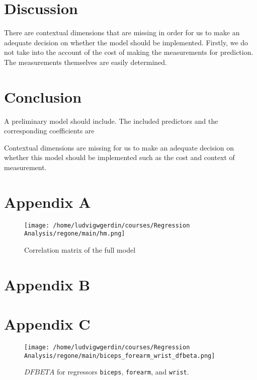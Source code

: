 \documentclass[11pt]{article}
\begin{document}


\newpage
\section{Discussion}
\label{sec:orge3adaf6}

There are contextual dimensions that are missing in order for us to make an adequate decision on whether 
the model should be implemented. Firstly, we do not take into the account of the cost of making the 
measurements for prediction. The measurements themselves are easily determined.

\section{Conclusion}
\label{sec:org7ffcbf9}

A preliminary model should include. The included predictors and the corresponding coefficients are 

Contextual dimensions are missing for us to make an adequate decision on whether this model should be implemented
such as the cost and context of measurement.

\section{Appendix A}
\label{sec:org05dbd80}

\begin{figure}[H]
\centering
\texttt{[image: /home/ludvigwgerdin/courses/Regression Analysis/regone/main/hm.png]}
\caption{\label{fig:org8b98f34}
Correlation matrix of the full model}
\end{figure}

\newpage

\section{Appendix B}
\label{sec:orgd77d6e3}





\newpage  

\section{Appendix C}
\label{sec:org7351ac4}

\begin{figure}[H]
\centering
\texttt{[image: /home/ludvigwgerdin/courses/Regression Analysis/regone/main/biceps\_forearm\_wrist\_dfbeta.png]}
\caption{\label{fig:org37cf27f}
\(DFBETA\) for regressors \texttt{biceps}, \texttt{forearm}, and \texttt{wrist}.}
\end{figure}
\end{document}
